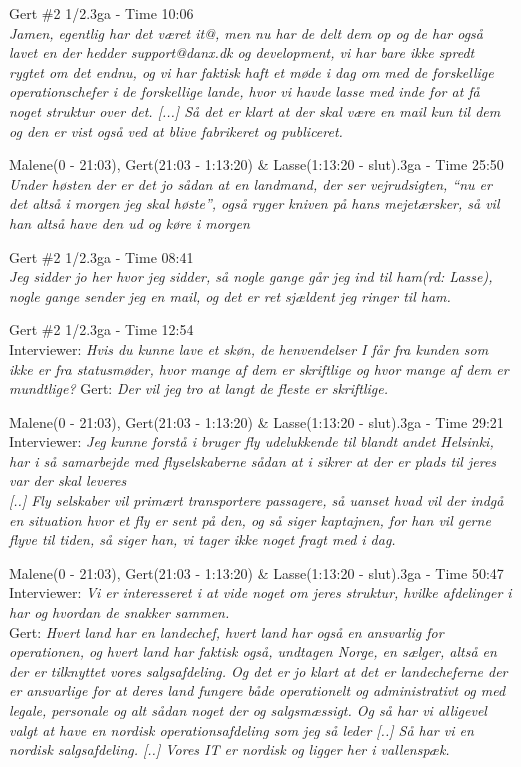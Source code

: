 \begin{thebibliography}{9}
	Gert \#2 1/2.3ga - Time 10:06\\
	\textit{Jamen, egentlig har det været it@, men nu har de delt dem op og de har også lavet en der hedder support@danx.dk og development, vi har bare ikke spredt rygtet om det endnu, og vi har faktisk haft et møde i dag om med de forskellige operationschefer i de forskellige lande, hvor vi havde lasse med inde for at få noget struktur over det. [...] Så det er klart at der skal være en mail kun til dem og den er vist også ved at blive fabrikeret og publiceret. }

	Malene(0 - 21:03), Gert(21:03 - 1:13:20) \& Lasse(1:13:20 - slut).3ga - Time 25:50\\
	\textit{Under høsten der er det jo sådan at en landmand, der ser vejrudsigten, “nu er det altså i morgen jeg skal høste”, også ryger kniven på hans mejetærsker, så vil han altså have den ud og køre i morgen}

	Gert \#2 1/2.3ga - Time 08:41\\
	\textit{Jeg sidder jo her hvor jeg sidder, så nogle gange går jeg ind til ham\emph{(rd: Lasse)}, nogle gange sender jeg en mail, og det er ret sjældent jeg ringer til ham.}

	Gert \#2 1/2.3ga - Time 12:54\\
	Interviewer: \textit{Hvis du kunne lave et skøn, de henvendelser I får fra kunden som ikke er fra statusmøder, hvor mange af dem er skriftlige og hvor mange af dem er mundtlige?} Gert: \textit{Der vil jeg tro at langt de fleste er skriftlige.}

	Malene(0 - 21:03), Gert(21:03 - 1:13:20) \& Lasse(1:13:20 - slut).3ga - Time 29:21\\
	Interviewer: \textit{Jeg kunne forstå i bruger fly udelukkende til blandt andet Helsinki, har i så samarbejde med flyselskaberne sådan at i sikrer at der er plads til jeres var der skal leveres}\\
	\textit{[..] Fly selskaber vil primært transportere passagere, så uanset hvad vil der indgå en situation hvor et fly er sent på den, og så siger kaptajnen, for han vil gerne flyve til tiden, så siger han, vi tager ikke noget fragt med i dag.}

	Malene(0 - 21:03), Gert(21:03 - 1:13:20) \& Lasse(1:13:20 - slut).3ga - Time 50:47\\
	Interviewer: \textit{Vi er interesseret i at vide noget om jeres struktur, hvilke afdelinger i har og hvordan de snakker sammen.}\\
	Gert: \textit{Hvert land har en landechef, hvert land har også en ansvarlig for operationen, og hvert land har faktisk også, undtagen Norge, en sælger, altså en der er tilknyttet vores salgsafdeling. Og det er jo klart at det er landecheferne der er ansvarlige for at deres land fungere både operationelt og administrativt og med legale, personale og alt sådan noget der og salgsmæssigt. Og så har vi alligevel valgt at have en nordisk operationsafdeling som jeg så leder [..] Så har vi en nordisk salgsafdeling. [..] Vores IT er nordisk og ligger her i vallenspæk. }


\end{thebibliography}
